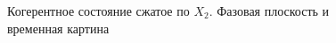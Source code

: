 \begin{figure}
\centering



\caption{Когерентное состояние сжатое по $X_2$. Фазовая плоскость и
  временная картина}
\label{figPart3Squeezed_5}
\end{figure}
